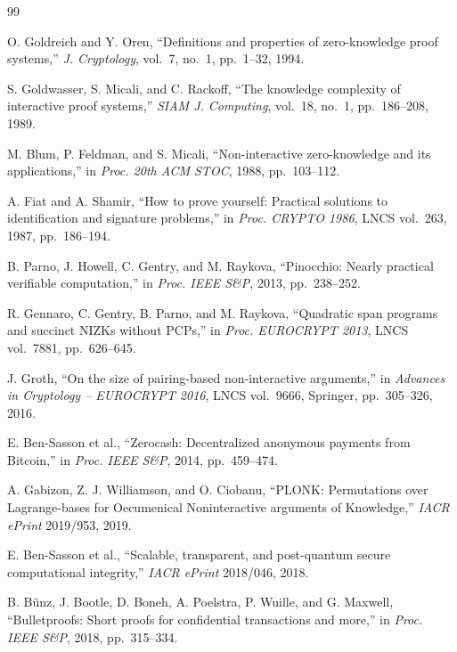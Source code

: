 \documentclass[12pt,a4paper,oneside]{report}
\begin{document}
\clearpage
{}

\begin{thebibliography}{99}

O. Goldreich and Y. Oren, ``Definitions and properties of zero-knowledge proof
systems,'' \textit{J. Cryptology}, vol.~7, no.~1, pp.~1--32, 1994.

S. Goldwasser, S. Micali, and C. Rackoff, ``The knowledge complexity of
interactive proof systems,'' \textit{SIAM J. Computing}, vol.~18, no.~1,
pp.~186--208, 1989.

M. Blum, P. Feldman, and S. Micali, ``Non-interactive zero-knowledge and its
applications,'' in \textit{Proc. 20th ACM STOC}, 1988, pp.~103--112.

A. Fiat and A. Shamir, ``How to prove yourself: Practical solutions to identification
and signature problems,'' in \textit{Proc. CRYPTO 1986}, LNCS vol.~263, 1987,
pp.~186--194.

B. Parno, J. Howell, C. Gentry, and M. Raykova, ``Pinocchio: Nearly practical
verifiable computation,'' in \textit{Proc. IEEE S\&P}, 2013, pp.~238--252.

R. Gennaro, C. Gentry, B. Parno, and M. Raykova, ``Quadratic span programs and
succinct NIZKs without PCPs,'' in \textit{Proc. EUROCRYPT 2013}, LNCS vol.~7881,
pp.~626--645.

J. Groth, ``On the size of pairing-based non-interactive arguments,'' in
\textit{Advances in Cryptology -- EUROCRYPT 2016}, LNCS vol.~9666, Springer,
pp.~305--326, 2016.

E. Ben-Sasson et al., ``Zerocash: Decentralized anonymous payments from Bitcoin,''
in \textit{Proc. IEEE S\&P}, 2014, pp.~459--474.

A. Gabizon, Z. J. Williamson, and O. Ciobanu, ``PLONK: Permutations over
Lagrange-bases for Oecumenical Noninteractive arguments of Knowledge,''
\textit{IACR ePrint} 2019/953, 2019.

E. Ben-Sasson et al., ``Scalable, transparent, and post-quantum secure computational
integrity,'' \textit{IACR ePrint} 2018/046, 2018.

B. B\"unz, J. Bootle, D. Boneh, A. Poelstra, P. Wuille, and G. Maxwell,
``Bulletproofs: Short proofs for confidential transactions and more,'' in
\textit{Proc. IEEE S\&P}, 2018, pp.~315--334.


\end{thebibliography}
\end{document}
